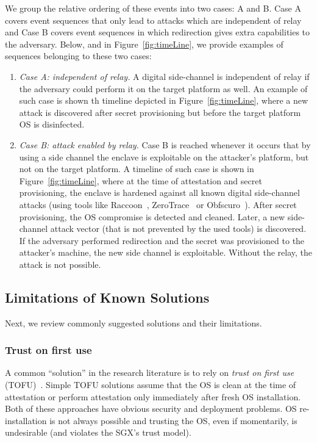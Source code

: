 We group the relative ordering of these events into two cases: A and B. Case A covers event sequences that only lead to attacks which are independent of relay and Case B covers event sequences in which redirection gives extra capabilities to the adversary. Below, and in Figure~\ref{fig:timeLine}, we provide examples of sequences belonging to these two cases:

\begin{enumerate}
    \item[]\emph{Case A: independent of relay.} A digital side-channel is independent of relay if the adversary could perform it on the target platform as well. An example of such case is shown th timeline depicted in Figure~\ref{fig:timeLine}, where a new attack is discovered after secret provisioning but before the target platform OS is disinfected.
    

    \item[]\emph{Case B: attack enabled by relay.} Case B is reached whenever it occurs that by using a side channel the enclave is exploitable on the attacker's platform, but not on the target platform. 
    A timeline of such case is shown in Figure~\ref{fig:timeLine}, where at the time of attestation and secret provisioning, the enclave is hardened against all known digital side-channel attacks (using tools like Raccoon~\cite{raccoon}, ZeroTrace~\cite{zerotrace} or Obfscuro~\cite{obfscuro}). After secret provisioning, the OS compromise is detected and cleaned. Later, a new side-channel attack vector (that is not prevented by the used tools) is discovered. If the adversary performed redirection and the secret was provisioned to the attacker's machine, the new side channel is exploitable. Without the relay, the attack is not possible.
    

\end{enumerate}


\subsection{Limitations of Known Solutions}
\label{sec:problemStatement:limitations}

Next, we review commonly suggested solutions and their limitations.

\subsubsection{Trust on first use} 
A common ``solution'' in the research literature is to rely on \emph{trust on first use} (TOFU)~\cite{tofu}. Simple TOFU solutions assume that the OS is clean at the time of attestation or perform attestation only immediately after fresh OS installation. Both of these approaches have obvious security and deployment problems. OS re-installation is not always possible and trusting the OS, even if momentarily, is undesirable (and violates the SGX's trust model).

